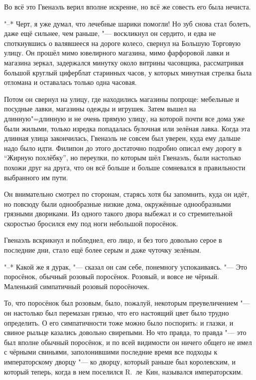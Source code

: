Во всё это Гвенаэль верил вполне искренне, но всё же совесть его была нечиста.

"--* Черт, я уже думал, что лечебные шарики помогли!
Но зуб снова стал болеть, даже ещё сильнее, чем раньше, "--- воскликнул он
сердито, и едва не споткнувшись о валявшееся на дороге колесо, свернул на
Большую Торговую улицу.
Он прошёл мимо ювелирного магазина, мимо фарфоровой лавки и магазина зеркал,
задержался минутку около витрины часовщика, рассматривая большой круглый
циферблат старинных часов, у которых минутная стрелка была отломана и оставалась
только одна часовая.

Потом он свернул на улицу, где находились магазины попроще: мебельные и посудные
лавки, магазины одежды и игрушек.
Затем вышел на длинную"=длинную и не очень прямую улицу, на которой почти все
дома уже были жилыми, только изредка попадалась булочная или зелёная лавка.
Когда эта длинная улица закончилась, Гвенаэль не совсем был уверен, куда ему
дальше надо было идти.
Филипон до этого достаточно подробно описал ему дорогу в \enquote{Жирную
похлёбку}, но переулки, по которым шёл Гвенаэль, были настолько похожи друг на
друга, что он всё больше и больше сомневался в правильности выбранного им пути.

Он внимательно смотрел по сторонам, старясь хотя бы запомнить, куда он идёт, но
повсюду были однообразные низкие дома, окружённые однообразными грязными
двориками.
Из одного такого двора выбежал и со стремительной скоростью бросился ему под
ноги небольшой поросёнок.

Гвенаэль вскрикнул и побледнел, его лицо, и без того довольно серое в последние
дни, стало ещё более серым и даже чуточку зелёным.

"--* Какой же я дурак, "--- сказал он сам себе, понемногу успокаиваясь.
"--- Это поросёнок, обычный розовый поросёнок.
Розовый, и вовсе не чёрный.
Маленький симпатичный розовый поросёночек.

То, что поросёнок был розовым, было, пожалуй, некоторым преувеличением "--- он
настолько был перемазан грязью, что его настоящий цвет было трудно определить.
О его симпатичности тоже можно было поспорить: и глазки, и свиное рыльце
казались довольно свирепыми.
Но что правда, то правда "--- это был вполне обычный поросёнок, и по всей
видимости он ничего общего не имел с чёрными свиньями, заполонившими последние
время все подходы к императорскому дворцу "--- ко дворцу, который раньше был
королевским, и который теперь, когда в нем поселился R.~ле~Кин, назывался
императорским.

